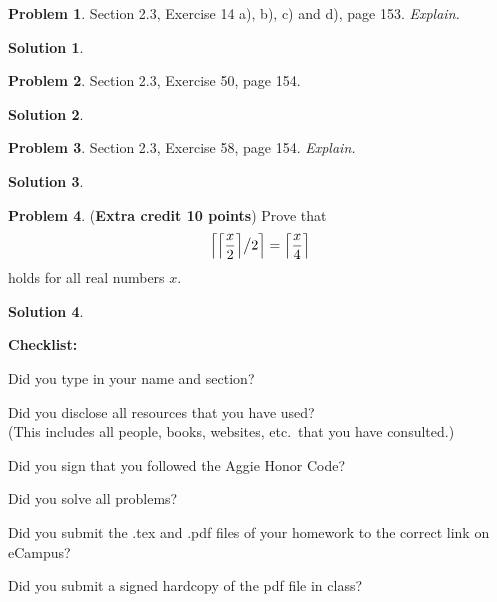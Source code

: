 \documentclass{article}
\theoremstyle{definition}
\newtheorem{problem}{Problem}
\newtheorem*{solution}{Solution}
\newcommand{\checklist}{\noindent\textbf{Checklist:}
\begin{compactitem}[$\Box$] 
\item Did you type in your name and section? 
\item Did you disclose all resources that you have used? \\
(This includes all people, books, websites, etc.\ that you have consulted.)
\item Did you sign that you followed the Aggie Honor Code? 
\item Did you solve all problems? 
\item Did you submit the .tex and .pdf files of your homework to the correct link on eCampus?
\item Did you submit a signed hardcopy of the pdf file in class? 
\end{compactitem}
}
\begin{document}
\begin{problem} Section 2.3, Exercise 14 a), b), c) and d), page 153. \textsl{Explain.}
\end{problem}
\begin{solution}
\end{solution}

\begin{problem} Section 2.3, Exercise 50, page 154. 
\end{problem}
\begin{solution}
\end{solution}

\begin{problem} Section 2.3, Exercise 58, page 154. \textsl{Explain.}
\end{problem}
\begin{solution}
\end{solution}

\begin{problem} (\textbf{Extra credit 10 points}) Prove that 
$$ \left\lceil {\left\lceil \displaystyle\frac{x}{2} \right\rceil} \big{/} {2} \right\rceil = 
\left\lceil \displaystyle\frac{x}{4} \right\rceil$$ holds for all real numbers $x$.
\end{problem}
\begin{solution}
\end{solution}

\goodbreak
\checklist
\end{document}
